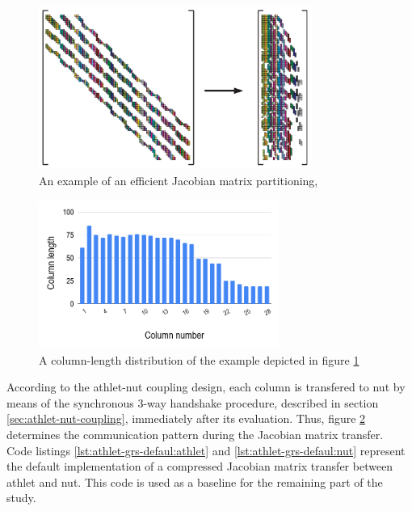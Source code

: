 \figpointer{\ref{fig:matrix-partitioning-example}}
\begin{figure}[htpb]
  \centering
  \includegraphics[width=0.8\textwidth]{figures/matrix-compression.png}
  \caption{An example of an efficient Jacobian matrix partitioning, \cite{gebremedhin2005color}} \label{fig:matrix-partitioning-example}
\end{figure}


\begin{figure}[htpb]
  \centering
  \includegraphics[width=0.7\textwidth]{figures/matrix-compression-2.png}
  \caption{A column-length distribution of the example depicted in figure \ref{fig:matrix-partitioning-example}} \label{fig:matrix-column-distribution}
\end{figure}


According to the \acrshort{athlet}-\acrshort{nut} coupling design, each column is transfered to \acrshort{nut} by means of the synchronous 3-way handshake procedure, described in section \ref{sec:athlet-nut-coupling}, immediately after its evaluation. Thus,  figure \ref{fig:matrix-column-distribution} determines the communication pattern during the Jacobian matrix transfer.\\


Code listings \ref{lst:athlet-grs-defaul:athlet} and \ref{lst:athlet-grs-defaul:nut} represent the default implementation of a compressed Jacobian matrix transfer between \acrshort{athlet} and \acrshort{nut}. This code is used as a baseline for the remaining part of the study.\\


